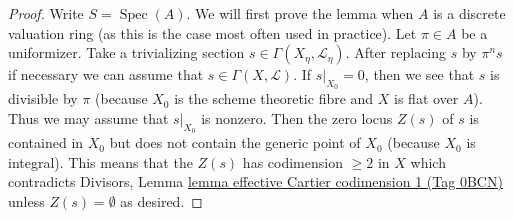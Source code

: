 \documentclass{amsart}
\theoremstyle{plain}
\theoremstyle{definition}
\theoremstyle{remark}
\numberwithin{equation}{subsection}
\def\Spec{\mathop{\mathrm{Spec}}}
\begin{document}
\begin{proof}
Write $S = \Spec(A)$. We will first prove the lemma when $A$ is a
discrete valuation ring (as this is the case most often used in practice).
Let $\pi \in A$ be a uniformizer.
Take a trivializing section $s \in \Gamma(X_\eta, \mathcal{L}_\eta)$.
After replacing $s$ by $\pi^n s$ if necessary
we can assume that $s \in \Gamma(X, \mathcal{L})$.
If $s|_{X_0} = 0$, then we see
that $s$ is divisible by $\pi$ (because $X_0$ is the scheme theoretic
fibre and $X$ is flat over $A$). Thus we may assume that $s|_{X_0}$
is nonzero. Then the zero locus $Z(s)$ of $s$ is contained in $X_0$
but does not contain the generic point of $X_0$ (because $X_0$ is integral).
This means that the $Z(s)$ has codimension $\geq 2$ in $X$ which contradicts
Divisors, Lemma \href{https://stacks.math.columbia.edu/tag/0BCN}{lemma effective Cartier codimension 1 (Tag 0BCN)}
unless $Z(s) = \emptyset$ as desired.


\end{proof}
\end{document}
